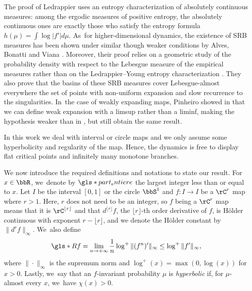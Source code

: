 The proof of Ledrappier uses an entropy characterization of absolutely continuous measures: among the ergodic measures of positive entropy, the absolutely continuous ones are exactly those who satisfy the entropy formula $h(\mu) = \int \log |f'| d \mu$. As~for higher-dimensional dynamics, the existence of SRB measures has been shown under similar though weaker conditions by Alves, Bonatti and Viana \cite{Alves2000}.
Moreover, their proof relies on a geometric study of the probability density with respect to the Lebesgue measure of the empirical measures rather than on the Ledrappier--Young entropy characterization \cite{Ledrappier_Young_1985a,Ledrappier_Young_1985b}.
They also prove that the basins of these SRB measures cover Lebesgue-almost everywhere the set of points with non-uniform expansion and slow recurrence to the singularities. In~the case of weakly expanding maps, Pinheiro showed in \cite{Pinheiro_2006,Pinheiro2011} that we can define weak expansion with a limsup rather than a liminf, making the hypothesis weaker than in \cite{Alves2000}, but still obtain the same result.

In this work we deal with interval or circle maps and we only assume some hyperbolicity and regularity of the map.
Hence, the dynamics is free to display flat critical points and infinitely many monotone branches.

We now introduce the required definitions and notations to state our result.
For $x \in \bbR$, we~denote by $\gls*{part_entiere}$ the largest integer less than or equal to $x$.
Let $I$ be the interval $[0, 1]$ or the circle $\bbS^1$ and $f : I \to I$ be a $\rC^r$ map where $r > 1$. Here, $r$ does not need to be an integer, so $f$ being a $\rC^r$ map means that it is $\rC^{\lfloor r \rfloor}$ and that $d^{\lfloor r \rfloor} f$, the $\lfloor r \rfloor$-th order derivative of $f$, is Hölder continuous with exponent $r - \lfloor r \rfloor$, and we denote the Hölder constant by $\| d^r f \|_{\infty}$. We~also define
\[
\gls*{Rf} = \lim_{n \to +\infty} \frac{1}{n} \log^+ \|(f^n)'\|_{\infty} \leq \log^+ \| f' \|_{\infty},
\]
where $\| \cdot \|_{\infty}$ is the supremum norm and $\log^+(x) =\max(0, \log(x))$ for $x > 0$.
Lastly, we~say that an $f$\nobreakdash-invariant probability $\mu$ is \textit{hyperbolic} if, for $\mu$-almost every $x$, we~have $\chi(x) > 0$.

